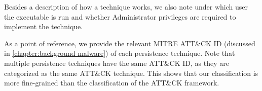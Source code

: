 Besides a description of how a technique works, we also note under which user the executable is run and whether Administrator privileges are required to implement the technique.

As a point of reference, we provide the relevant MITRE ATT\&CK ID (discussed in \autoref{chapter:background malware}) of each persistence technique. Note that multiple persistence techniques have the same ATT\&CK ID, as they are categorized as the same ATT\&CK technique. This shows that our classification is more fine-grained than the classification of the ATT\&CK framework.





